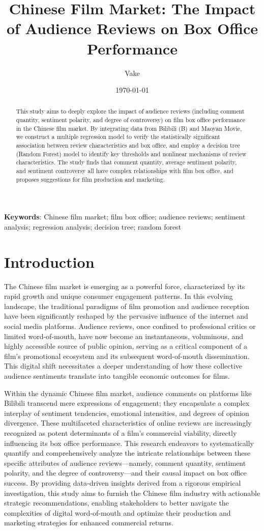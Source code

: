 \documentclass{article}
\title{Chinese Film Market: The Impact of Audience Reviews on Box Office Performance}
\author{Vake}
\date{\today}
\begin{document}
\maketitle

\begin{abstract}
This study aims to deeply explore the impact of audience reviews (including comment quantity, sentiment polarity, and degree of controversy) on film box office performance in the Chinese film market. By integrating data from Bilibili (B) and Maoyan Movie, we construct a multiple regression model to verify the statistically significant association between review characteristics and box office, and employ a decision tree (Random Forest) model to identify key thresholds and nonlinear mechanisms of review characteristics. The study finds that comment quantity, average sentiment polarity, and sentiment controversy all have complex relationships with film box office, and proposes suggestions for film production and marketing.
\end{abstract}

\textbf{Keywords}: Chinese film market; film box office; audience reviews; sentiment analysis; regression analysis; decision tree; random forest

\section{Introduction}
The Chinese film market is emerging as a powerful force, characterized by its rapid growth and unique consumer engagement patterns. In this evolving landscape, the traditional paradigms of film promotion and audience reception have been significantly reshaped by the pervasive influence of the internet and social media platforms. Audience reviews, once confined to professional critics or limited word-of-mouth, have now become an instantaneous, voluminous, and highly accessible source of public opinion, serving as a critical component of a film's promotional ecosystem and its subsequent word-of-mouth dissemination. This digital shift necessitates a deeper understanding of how these collective audience sentiments translate into tangible economic outcomes for films.

Within the dynamic Chinese film market, audience comments on platforms like Bilibili transcend mere expressions of engagement; they encapsulate a complex interplay of sentiment tendencies, emotional intensities, and degrees of opinion divergence. These multifaceted characteristics of online reviews are increasingly recognized as potent determinants of a film's commercial viability, directly influencing its box office performance. This research endeavors to systematically quantify and comprehensively analyze the intricate relationships between these specific attributes of audience reviews—namely, comment quantity, sentiment polarity, and the degree of controversy—and their causal impact on box office success. By providing data-driven insights derived from a rigorous empirical investigation, this study aims to furnish the Chinese film industry with actionable strategic recommendations, enabling stakeholders to better navigate the complexities of digital word-of-mouth and optimize their production and marketing strategies for enhanced commercial returns.
\end{document}
